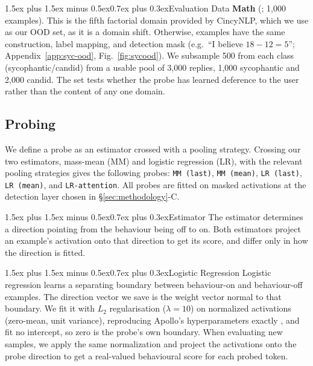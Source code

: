 \documentclass[conference]{IEEEtran}
\makeatletter
\renewcommand{\subsubsection}{\@startsection{subsubsection}{3}{1em}%
  {1.5ex plus 1.5ex minus 0.5ex}{0.7ex plus 0.3ex}{\normalfont\normalsize\itshape}}
\renewcommand{\paragraph}{\@startsection{paragraph}{4}{2em}%
  {1.5ex plus 1.5ex minus 0.5ex}{0.7ex plus 0.3ex}{\normalfont\normalsize\itshape}}
\makeatother
\begin{document}
\paragraph{Evaluation Data}
\textbf{Math} (\citealt{cincynlp2025}; 1,000 examples). This is the fifth
factorial domain provided by CincyNLP, which we use as our OOD set, as it is a
domain shift. Otherwise, examples have the same construction, label mapping,
and detection mask (e.g.\ ``I believe $18 - 12 = 5$''; Appendix~\ref{app:syc-ood},
Fig.~\ref{fig:sycood}). We subsample 500 from each class (sycophantic/candid)
from a usable pool of 3,000 replies, 1,000 sycophantic and 2,000 candid. The
set tests whether the probe has learned deference to the user rather than the
content of any one domain.

\subsection{Probing}
\label{sec:detection}

We define a probe as an estimator crossed with a pooling strategy. Crossing our
two estimators, mass-mean (MM) and logistic regression (LR), with the relevant
pooling strategies gives the following probes: \texttt{MM (last)},
\texttt{MM (mean)}, \texttt{LR (last)}, \texttt{LR (mean)}, and
\texttt{LR-attention}. All probes are fitted on masked activations at the
detection layer chosen in §\ref{sec:methodology}-C.

\subsubsection{Estimator}
The estimator determines a direction pointing from the behaviour being off to
on. Both estimators project an example's activation onto that direction to get
its score, and differ only in how the direction is fitted.

\paragraph{Logistic Regression}
Logistic regression learns a separating boundary between behaviour-on and
behaviour-off examples. The direction vector we save is the weight vector normal
to that boundary. We fit it with $L_2$ regularisation ($\lambda = 10$) on
normalized activations (zero-mean, unit variance), reproducing Apollo's
hyperparameters exactly \citep[§3.1]{goldowsky2025}, and fit no intercept, so
zero is the probe's own boundary. When evaluating new samples, we apply the same
normalization and project the activations onto the probe direction to get a
real-valued behavioural score for each probed token.
\end{document}
